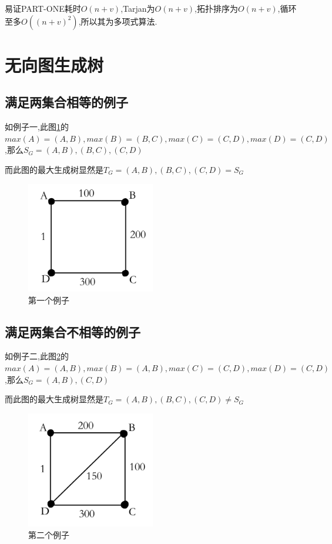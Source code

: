 \documentclass[cn,11pt,chinese]{elegantbook}
\begin{document}
易证PART-ONE耗时$ O(n+v) $,Tarjan为$ O(n+v) $,拓扑排序为$ O(n+v) $,循环至多$ O((n+v)^2) $,所以其为多项式算法.

\section{无向图生成树}

\subsection{满足两集合相等的例子}

如例子一,此图\ref{Ch9S2_1}的$ max(A) = (A,B) , max(B) = (B,C) , max(C) = (C,D) , max(D) = (C,D) $,那么$ S_G = {(A,B),(B,C),(C,D)} $

而此图的最大生成树显然是$ T_G = {(A,B),(B,C),(C,D)} = S_G$

\begin{figure}[htbp]
	\centering
	\includegraphics[width=0.5\textwidth]{image/Ch9S2_1.png}
	\caption{第一个例子}
  \label{Ch9S2_1}
\end{figure}

\subsection{满足两集合不相等的例子}

如例子二,此图\ref{Ch9S2_2}的$ max(A) = (A,B) , max(B) = (A,B) , max(C) = (C,D) , max(D) = (C,D) $,那么$ S_G = {(A,B),(C,D)} $

而此图的最大生成树显然是$ T_G = {(A,B),(B,C),(C,D)} \neq S_G$

\begin{figure}[htbp]
	\centering
	\includegraphics[width=0.5\textwidth]{image/Ch9S2_2.png}
	\caption{第二个例子}
  \label{Ch9S2_2}
\end{figure}
\end{document}
